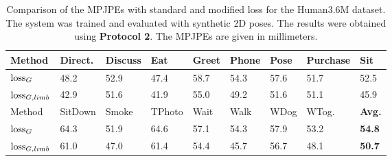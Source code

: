\begin{table}[bt]	
	\centering
	\begin{tabularx}{\textwidth}{l *{8}{Y}}
		\toprule
		Method & Direct. & Discuss & Eat & Greet & Phone & Pose & Purchase & Sit \\
		\midrule
		$\operatorname{loss}_G$ & 48.2 & 52.9 & 47.4 & 58.7 & 54.3 & 57.6 & 51.7 & 52.5\\
		$\operatorname{loss}_{G, limb}$ & 42.9 & 51.6 & 41.9 & 55.0 & 49.2 & 51.6 & 51.1 & 45.9 \\
		\bottomrule
		\toprule
		Method & SitDown & Smoke & TPhoto & Wait & Walk & WDog & WTog. & \textbf{Avg.}\\
		\midrule
		$\operatorname{loss}_G$ & 64.3 & 51.9 & 64.6 & 57.1 & 54.3 & 57.9 & 53.2 & \textbf{54.8} \\
		$\operatorname{loss}_{G, limb}$ & 61.0 & 47.0 & 61.4 & 54.4 & 45.7 & 56.7 & 48.1 & \textbf{50.7} \\
		\bottomrule
	\end{tabularx}
	\caption{
		Comparison of the MPJPEs with standard and modified loss for the Human3.6M dataset.
		The system was trained and evaluated with synthetic 2D poses.
		The results were obtained using \textbf{Protocol 2}. 
		The MPJPEs are given in millimeters.
	 }
	\label{tbl:results-limb-loss}
\end{table}